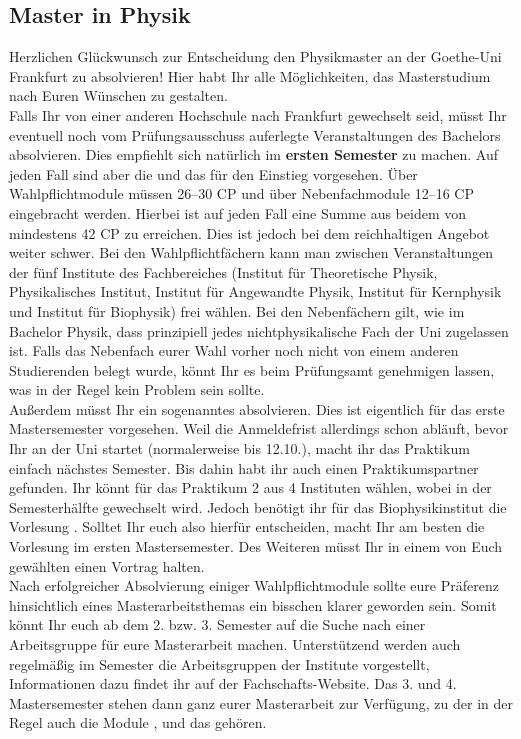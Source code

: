 \subsection{Master in Physik}
\label{subsec:studienstruktur_msc_physik}
Herzlichen Glückwunsch zur Entscheidung den Physikmaster an der Goethe-Uni Frankfurt zu absolvieren! Hier habt Ihr alle Möglichkeiten, das Masterstudium nach Euren Wünschen zu gestalten.\\
Falls Ihr von einer anderen Hochschule nach Frankfurt gewechselt seid, müsst Ihr eventuell noch vom Prüfungsausschuss auferlegte Veranstaltungen des Bachelors absolvieren. Dies empfiehlt sich natürlich im \textbf{ersten Semester} zu machen. Auf jeden Fall sind aber die   und das  für den Einstieg vorgesehen. Über Wahlpflichtmodule müssen 26--30 CP und über Nebenfachmodule 12--16 CP eingebracht werden. Hierbei ist auf jeden Fall eine Summe aus beidem von mindestens 42 CP zu erreichen. Dies ist jedoch bei dem reichhaltigen Angebot weiter schwer. Bei den Wahlpflichtfächern kann man zwischen Veranstaltungen der fünf Institute des Fachbereiches (Institut für Theoretische Physik, Physikalisches Institut, Institut für Angewandte Physik, Institut für Kernphysik und Institut für Biophysik) frei wählen. Bei den Nebenfächern gilt, wie im Bachelor Physik, dass prinzipiell jedes nichtphysikalische Fach der Uni zugelassen ist. Falls das Nebenfach eurer Wahl vorher noch nicht von einem anderen Studierenden belegt wurde, könnt Ihr es beim Prüfungsamt genehmigen lassen, was in der Regel kein Problem sein sollte.\\
Au\ss erdem müsst Ihr ein sogenanntes  absolvieren. Dies ist eigentlich für das erste Mastersemester vorgesehen. Weil die Anmeldefrist allerdings schon abläuft, bevor Ihr an der Uni startet (normalerweise bis 12.10.), macht ihr das Praktikum einfach nächstes Semester. Bis dahin habt ihr auch einen Praktikumspartner gefunden. Ihr könnt für das Praktikum 2 aus 4 Instituten wählen, wobei in der Semesterhälfte gewechselt wird. Jedoch benötigt ihr für das Biophysikinstitut die Vorlesung . Solltet Ihr euch also hierfür entscheiden, macht Ihr am besten die Vorlesung im ersten Mastersemester. Des Weiteren müsst Ihr in einem von Euch gewählten  einen Vortrag halten.\\
Nach erfolgreicher Absolvierung einiger Wahlpflichtmodule sollte eure Präferenz hinsichtlich eines Masterarbeitsthemas ein bisschen klarer geworden sein. Somit könnt Ihr euch ab dem 2. bzw. 3. Semester auf die Suche nach einer Arbeitsgruppe für eure Masterarbeit machen. Unterstützend werden auch regelmä\ss ig im Semester die Arbeitsgruppen der Institute vorgestellt, Informationen dazu findet ihr auf der Fachschafts-Website. Das 3. und 4. Mastersemester stehen dann ganz eurer Masterarbeit zur Verfügung, zu der in der Regel auch die Module ,  und das  gehören.